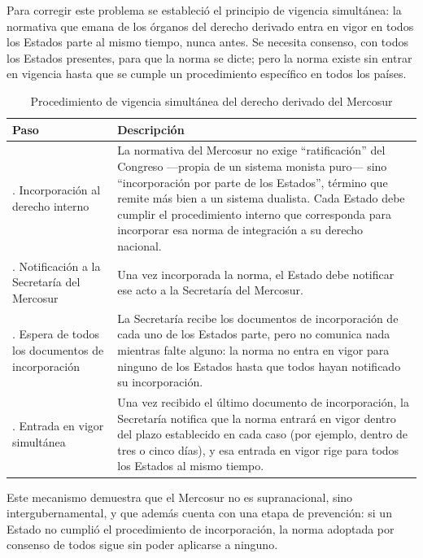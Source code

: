 \documentclass[12pt,oneside]{book}
\begin{document}
Para corregir este problema se estableció el principio de vigencia simultánea: la normativa que emana de los órganos del derecho derivado entra en vigor en todos los Estados parte al mismo tiempo, nunca antes. Se necesita consenso, con todos los Estados presentes, para que la norma se dicte; pero la norma existe sin entrar en vigencia hasta que se cumple un procedimiento específico en todos los países.

\begin{table}[H]
\centering
\caption{Procedimiento de vigencia simultánea del derecho derivado del Mercosur}
\begin{tabularx}{\textwidth}{@{}>{\raggedright\arraybackslash}p{}X@{}}
\toprule
\textbf{Paso} & \textbf{Descripción} \\
\midrule
1. Incorporación al derecho interno &
La normativa del Mercosur no exige ``ratificación'' del Congreso —propia de un sistema monista puro— sino ``incorporación por parte de los Estados'', término que remite más bien a un sistema dualista. Cada Estado debe cumplir el procedimiento interno que corresponda para incorporar esa norma de integración a su derecho nacional. \\
\addlinespace
2. Notificación a la Secretaría del Mercosur &
Una vez incorporada la norma, el Estado debe notificar ese acto a la Secretaría del Mercosur. \\
\addlinespace
3. Espera de todos los documentos de incorporación &
La Secretaría recibe los documentos de incorporación de cada uno de los Estados parte, pero no comunica nada mientras falte alguno: la norma no entra en vigor para ninguno de los Estados hasta que todos hayan notificado su incorporación. \\
\addlinespace
4. Entrada en vigor simultánea &
Una vez recibido el último documento de incorporación, la Secretaría notifica que la norma entrará en vigor dentro del plazo establecido en cada caso (por ejemplo, dentro de tres o cinco días), y esa entrada en vigor rige para todos los Estados al mismo tiempo. \\
\bottomrule
\end{tabularx}
\end{table}

Este mecanismo demuestra que el Mercosur no es supranacional, sino intergubernamental, y que además cuenta con una etapa de prevención: si un Estado no cumplió el procedimiento de incorporación, la norma adoptada por consenso de todos sigue sin poder aplicarse a ninguno.
\end{document}
